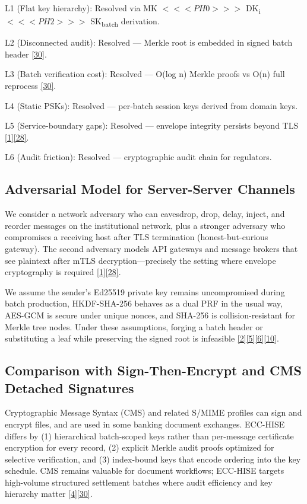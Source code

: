 \indent L1 (Flat key hierarchy): Resolved via MK $<<<PH0>>>$ DK\textsubscript{i} $<<<PH2>>>$ SK\textsubscript{batch} derivation.

\indent L2 (Disconnected audit): Resolved --- Merkle root is embedded in signed batch header \hyperref[ref:30]{[30]}.

\indent L3 (Batch verification cost): Resolved --- O(log n) Merkle proofs vs O(n) full reprocess \hyperref[ref:30]{[30]}.

\indent L4 (Static PSKs): Resolved --- per-batch session keys derived from domain keys.

\indent L5 (Service-boundary gaps): Resolved --- envelope integrity persists beyond TLS \hyperref[ref:1]{[1]}\hyperref[ref:28]{[28]}.

\indent L6 (Audit friction): Resolved --- cryptographic audit chain for regulators.

\subsection{Adversarial Model for Server-Server Channels}

\indent We consider a network adversary who can eavesdrop, drop, delay, inject, and reorder messages on the institutional network, plus a stronger adversary who compromises a receiving host after TLS termination (honest-but-curious gateway). The second adversary models API gateways and message brokers that see plaintext after mTLS decryption---precisely the setting where envelope cryptography is required \hyperref[ref:1]{[1]}\hyperref[ref:28]{[28]}.

\indent We assume the sender's Ed25519 private key remains uncompromised during batch production, HKDF-SHA-256 behaves as a dual PRF in the usual way, AES-GCM is secure under unique nonces, and SHA-256 is collision-resistant for Merkle tree nodes. Under these assumptions, forging a batch header or substituting a leaf while preserving the signed root is infeasible \hyperref[ref:2]{[2]}\hyperref[ref:5]{[5]}\hyperref[ref:6]{[6]}\hyperref[ref:10]{[10]}.

\subsection{Comparison with Sign-Then-Encrypt and CMS Detached Signatures}

\indent Cryptographic Message Syntax (CMS) and related S/MIME profiles can sign and encrypt files, and are used in some banking document exchanges. ECC-HISE differs by (1) hierarchical batch-scoped keys rather than per-message certificate encryption for every record, (2) explicit Merkle audit proofs optimized for selective verification, and (3) index-bound keys that encode ordering into the key schedule. CMS remains valuable for document workflows; ECC-HISE targets high-volume structured settlement batches where audit efficiency and key hierarchy matter \hyperref[ref:4]{[4]}\hyperref[ref:30]{[30]}.

